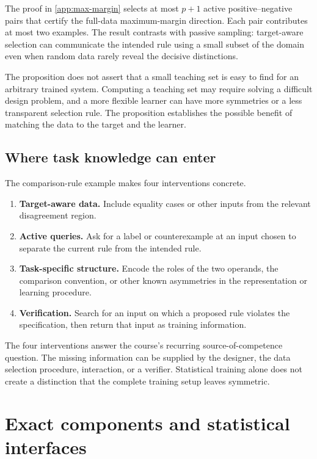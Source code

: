 \documentclass[11pt,twoside]{article}
\theoremstyle{definition}
\theoremstyle{remark}
\begin{document}
The proof in \cref{app:max-margin} selects at most \(p+1\) active
positive--negative pairs that certify the full-data maximum-margin direction.
Each pair contributes at most two examples. The result contrasts with passive
sampling: target-aware selection can communicate the intended rule using a
small subset of the domain even when random data rarely reveal the decisive
distinctions.

The proposition does not assert that a small teaching set is easy to find for
an arbitrary trained system. Computing a teaching set may require solving a
difficult design problem, and a more flexible learner can have more
symmetries or a less transparent selection rule. The proposition establishes
the possible benefit of matching the data to the target and the learner.

\subsection{Where task knowledge can enter}
\label{sec:task-knowledge}

The comparison-rule example makes four interventions concrete.

\begin{enumerate}[leftmargin=*]
\item \textbf{Target-aware data.} Include equality cases or other inputs from
the relevant disagreement region.
\item \textbf{Active queries.} Ask for a label or counterexample at an input
chosen to separate the current rule from the intended rule.
\item \textbf{Task-specific structure.} Encode the roles of the two operands,
the comparison convention, or other known asymmetries in the representation or
learning procedure.
\item \textbf{Verification.} Search for an input on which a proposed rule
violates the specification, then return that input as training information.
\end{enumerate}

The four interventions answer the course's recurring source-of-competence
question. The missing information can be supplied by the designer, the data
selection procedure, interaction, or a verifier. Statistical training alone
does not create a distinction that the complete training setup leaves
symmetric.

\section{Exact components and statistical interfaces}
\label{sec:systems}
\end{document}
